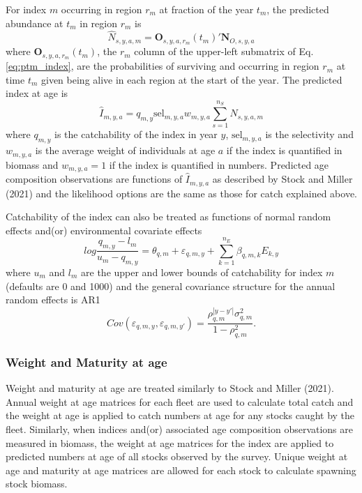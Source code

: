 \documentclass[
]{article}
\begin{document}
For index \(m\) occurring in region \(r_m\) at fraction of the year
\(t_m\), the predicted abundance at \(t_m\) in region \(r_m\) is
\[\widehat{N}_{s,y,a,m} = \mathbf{O}_{s,y,a,r_m}(t_m)' \mathbf{N}_{O,s,y,a}\]
where \(\mathbf{O}_{s,y,a,r_m}(t_m)\), the \(r_m\) column of the
upper-left submatrix of Eq. \ref{eq:ptm_index}, are the probabilities of
surviving and occurring in region \(r_m\) at time \(t_m\) given being
alive in each region at the start of the year. The predicted index at
age is
\[\widehat{I}_{m,y,a} = q_{m,y} \text{sel}_{m,y,a}w_{m,y,a}\sum^{n_S}_{s = 1}\widehat{N}_{s,y,a,m}\]
where \(q_{m,y}\) is the catchability of the index in year \(y\),
\(\text{sel}_{m,y,a}\) is the selectivity and \(w_{m,y,a}\) is the
average weight of individuals at age \(a\) if the index is quantified in
biomass and \(w_{m,y,a} = 1\) if the index is quantified in numbers.
Predicted age composition observations are functions of
\(\widehat{I}_{m,y,a}\) as described by Stock and Miller (2021) and the
likelihood options are the same as those for catch explained above.

Catchability of the index can also be treated as functions of normal
random effects and(or) environmental covariate effects
\[log \frac{q_{m,y}-l_m}{u_m-q_{m,y}} = \theta_{q,m} + \varepsilon_{q,m,y}  + \sum^{n_E}_{k=1} \beta_{q,m,k} E_{k,y}\]
where \(u_{m}\) and \(l_{m}\) are the upper and lower bounds of
catchability for index \(m\) (defaults are 0 and 1000) and the general
covariance structure for the annual random effects is AR1
\[Cov\left(\varepsilon_{q,m,y},\varepsilon_{q,m,y'}\right) =   \frac{\rho_{q,m}^{|y-y'|}\sigma^2_{q,m}}{1 - \rho_{q,m}^2}.\]

\hypertarget{weight-and-maturity-at-age}{%
\subsubsection*{Weight and Maturity at
age}\label{weight-and-maturity-at-age}}

Weight and maturity at age are treated similarly to Stock and Miller
(2021). Annual weight at age matrices for each fleet are used to
calculate total catch and the weight at age is applied to catch numbers
at age for any stocks caught by the fleet. Similarly, when indices
and(or) associated age composition observations are measured in biomass,
the weight at age matrices for the index are applied to predicted
numbers at age of all stocks observed by the survey. Unique weight at
age and maturity at age matrices are allowed for each stock to calculate
spawning stock biomass.
\end{document}
